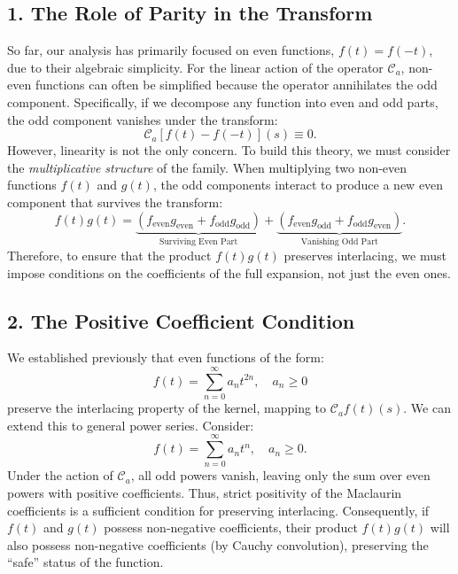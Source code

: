 \documentclass[11pt]{article}
\theoremstyle{breakdef}
\begin{document}
\subsection*{1. The Role of Parity in the Transform}
So far, our analysis has primarily focused on even functions, $f(t) = f(-t)$, due to their algebraic simplicity. For the linear action of the operator $\mathcal{C}_a$, non-even functions can often be simplified because the operator annihilates the odd component. Specifically, if we decompose any function into even and odd parts, the odd component vanishes under the transform:
\begin{equation}
\mathcal{C}_{a} \left[ f(t) - f(-t) \right](s) \equiv 0.
\end{equation}
However, linearity is not the only concern. To build this theory, we must consider the \textit{multiplicative structure} of the family. When multiplying two non-even functions $f(t)$ and $g(t)$, the odd components interact to produce a new even component that survives the transform:
\begin{equation}
f(t)g(t) = \underbrace{(f_{\text{even}}g_{\text{even}} + f_{\text{odd}}g_{\text{odd}})}_{\text{Surviving Even Part}} + \underbrace{(f_{\text{even}}g_{\text{odd}} + f_{\text{odd}}g_{\text{even}})}_{\text{Vanishing Odd Part}}.
\end{equation}
Therefore, to ensure that the product $f(t)g(t)$ preserves interlacing, we must impose conditions on the coefficients of the full expansion, not just the even ones.

\subsection*{2. The Positive Coefficient Condition}
We established previously that even functions of the form:
\begin{equation}
f(t) = \sum _{n=0}^{\infty } a_n t^{2n}, \quad a_n \ge 0
\end{equation}
preserve the interlacing property of the kernel, mapping to $\mathcal{C}_{a} f(t) (s)$. We can extend this to general power series. Consider:
\begin{equation}
f(t) = \sum _{n=0}^{\infty } a_n t^n, \quad a_n \ge 0.
\end{equation}
Under the action of $\mathcal{C}_a$, all odd powers vanish, leaving only the sum over even powers with positive coefficients. Thus, strict positivity of the Maclaurin coefficients is a sufficient condition for preserving interlacing. Consequently, if $f(t)$ and $g(t)$ possess non-negative coefficients, their product $f(t)g(t)$ will also possess non-negative coefficients (by Cauchy convolution), preserving the ``safe'' status of the function.
\end{document}
